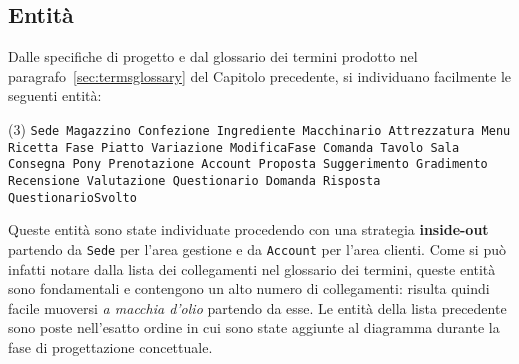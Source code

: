 \subsection{Entità}
Dalle specifiche di progetto e dal glossario dei termini prodotto nel
paragrafo~\vref{sec:termsglossary} del Capitolo precedente, si individuano facilmente
le seguenti entità:
\begin{tasks}[label=\textbullet](3)
    \task\tt Sede
    \task\tt Magazzino
    \task\tt Confezione
    \task\tt Ingrediente
    \task\tt Macchinario
    \task\tt Attrezzatura
    \task\tt Menu
    \task\tt Ricetta
    \task\tt Fase
    \task\tt Piatto
    \task\tt Variazione
    \task\tt ModificaFase\footnotemark
    \task\tt Comanda
    \task\tt Tavolo
    \task\tt Sala
    \task\tt Consegna
    \task\tt Pony
    \task\tt Prenotazione
    \task\tt Account
    \task\tt Proposta
    \task\tt Suggerimento
    \task\tt Gradimento
    \task\tt Recensione
    \task\tt Valutazione
    \task\tt Questionario
    \task\tt Domanda
    \task\tt Risposta
    \task\tt QuestionarioSvolto
\end{tasks}
Queste entità sono state individuate procedendo con una strategia {\bf inside-out}
partendo da {\tt Sede} per l'area gestione e da {\tt Account} per l'area clienti. Come
si può infatti notare dalla lista dei collegamenti nel glossario dei termini, queste
entità sono fondamentali e contengono un alto numero di collegamenti: risulta quindi
facile muoversi {\it a macchia d'olio} partendo da esse.
Le entità della lista precedente sono poste nell'esatto ordine in cui sono state
aggiunte al diagramma durante la fase di progettazione concettuale.
